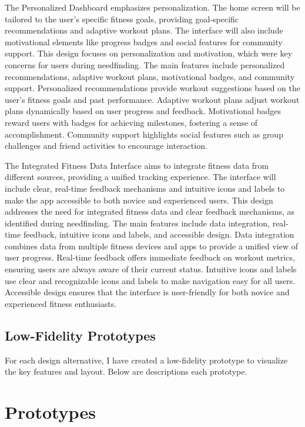 \documentclass[
	letterpaper, %
]{jdf}
\begin{document}
The Personalized Dashboard emphasizes personalization. The home screen will be tailored to the user's specific fitness goals, providing goal-specific recommendations and adaptive workout plans. The interface will also include motivational elements like progress badges and social features for community support. This design focuses on personalization and motivation, which were key concerns for users during needfinding. The main features include personalized recommendations, adaptive workout plans, motivational badges, and community support. Personalized recommendations provide workout suggestions based on the user's fitness goals and past performance. Adaptive workout plans adjust workout plans dynamically based on user progress and feedback. Motivational badges reward users with badges for achieving milestones, fostering a sense of accomplishment. Community support highlights social features such as group challenges and friend activities to encourage interaction.

The Integrated Fitness Data Interface aims to integrate fitness data from different sources, providing a unified tracking experience. The interface will include clear, real-time feedback mechanisms and intuitive icons and labels to make the app accessible to both novice and experienced users. This design addresses the need for integrated fitness data and clear feedback mechanisms, as identified during needfinding. The main features include data integration, real-time feedback, intuitive icons and labels, and accessible design. Data integration combines data from multiple fitness devices and apps to provide a unified view of user progress. Real-time feedback offers immediate feedback on workout metrics, ensuring users are always aware of their current status. Intuitive icons and labels use clear and recognizable icons and labels to make navigation easy for all users. Accessible design ensures that the interface is user-friendly for both novice and experienced fitness enthusiasts.

\subsection {Low-Fidelity Prototypes}
For each design alternative, I have created a low-fidelity prototype to visualize the key features and layout. Below are descriptions each prototype.
\hfill \break
\hfill \break

\section{Prototypes}
\end{document}
